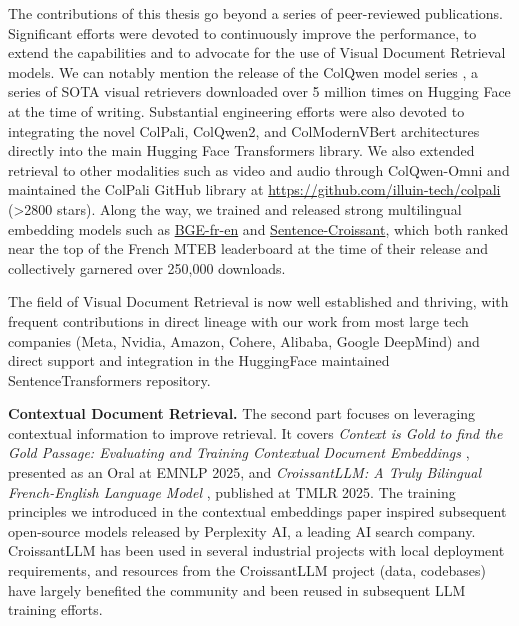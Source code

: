 The contributions of this thesis go beyond a series of peer-reviewed publications. Significant efforts were devoted to continuously improve the performance, to extend the capabilities and to advocate for the use of Visual Document Retrieval models. We can notably mention the release of the ColQwen model series , a series of SOTA visual retrievers downloaded over 5 million times on Hugging Face at the time of writing. Substantial engineering efforts were also devoted to integrating the novel ColPali, ColQwen2, and ColModernVBert architectures directly into the main Hugging Face Transformers library.
We also extended retrieval to other modalities such as video and audio through ColQwen-Omni  and maintained the ColPali GitHub library at \url{https://github.com/illuin-tech/colpali} (>2800 stars). Along the way, we trained and released strong multilingual embedding models such as \href{https://huggingface.co/manu/bge-fr-en}{BGE-fr-en} and \href{https://huggingface.co/manu/sentence_croissant_alpha_v0.4}{Sentence-Croissant}, which both ranked near the top of the French MTEB leaderboard at the time of their release and collectively garnered over 250,000 downloads.

The field of Visual Document Retrieval is now well established and thriving, with frequent contributions in direct lineage with our work from most large tech companies (Meta, Nvidia, Amazon, Cohere, Alibaba, Google DeepMind) and direct support and integration in the HuggingFace maintained SentenceTransformers repository.


\noindent\textbf{Contextual Document Retrieval.} The second part focuses on leveraging contextual information to improve retrieval. It covers \emph{Context is Gold to find the Gold Passage: Evaluating and Training Contextual Document Embeddings} , presented as an Oral at EMNLP 2025, and \emph{CroissantLLM: A Truly Bilingual French-English Language Model} , published at TMLR 2025. The training principles we introduced in the contextual embeddings paper inspired subsequent open-source models released by Perplexity AI, a leading AI search company. CroissantLLM has been used in several industrial projects with local deployment requirements, and resources from the CroissantLLM project (data, codebases) have largely benefited the community and been reused in subsequent LLM training efforts.


